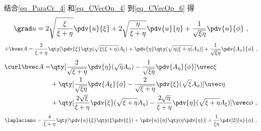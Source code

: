 结合\autoref{eq_ParaCr_4} 和\autoref{eq_CVecOp_4} 到\autoref{eq_CVecOp_6} 得
\begin{equation}
\grad u = 2\sqrt{\frac{\xi}{\xi + \eta}}\pdv{u}{\xi} + 2\sqrt{\frac{\eta}{\xi + \eta}}\pdv{u}{\eta} + \frac{1}{\sqrt{\xi\eta}}\pdv{u}{\phi}~,
\end{equation}
\begin{equation}
\div \bvec A = \frac{2}{\xi + \eta}\qty[\pdv{\xi}\qty(\sqrt{\xi(\xi+\eta)}A_\xi) + \pdv{\eta}\qty(\sqrt{\eta(\xi+\eta)}A_\eta)] + \frac{1}{\sqrt{\xi\eta}} \pdv{A_\phi}{\phi}~,
\end{equation}
\begin{equation}
\begin{aligned}
\curl \bvec A = &\qty[\frac{2}{\sqrt{\xi+\eta}}\pdv{\eta} (\sqrt{\eta}A_\phi) - \frac{1}{\sqrt{\xi\eta}}\pdv{A_\eta}{\phi}]\uvec \xi\\
&+\qty[\frac{1}{\sqrt{\xi\eta}}\pdv{A_\xi}{\phi} - \frac{2}{\sqrt{\xi+\eta}}\pdv{\xi}(\sqrt{\xi}A_\phi)]\uvec\eta\\
&+\qty[\frac{2\sqrt{\xi}}{\xi+\eta}\pdv{\xi}(\sqrt{\xi+\eta}A_\eta) - \frac{2\sqrt{\eta}}{\xi+\eta}\pdv{\eta}(\sqrt{\xi+\eta}A_\xi)]\uvec\phi~,
\end{aligned}
\end{equation}
\begin{equation} %
\laplacian u = \frac{4}{\xi + \eta} \qty[\pdv{u}{\xi}\qty(\xi\pdv{\xi}) + \pdv{u}{\eta}\qty(\eta\pdv{\eta})] + \frac{1}{\xi\eta}\pdv[2]{u}{\phi}~.
\end{equation}
